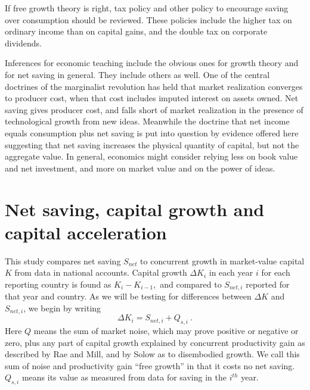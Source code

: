 If free growth theory is right, tax policy and other policy to encourage
saving over consumption should be reviewed. These policies
include the higher tax on ordinary income than on capital gains, and the
double tax on corporate dividends.

Inferences for economic teaching include the obvious ones for growth
theory and for net saving in general. They include others as well.
One of the central doctrines of the marginalist revolution has held that
market realization converges to producer cost, when that cost includes
imputed interest on assets owned. Net saving gives producer cost,
and falls short of market realization in the presence of technological
growth from new ideas. Meanwhile the doctrine that net income equals
consumption plus net saving is put into question by evidence offered
here suggesting that net saving increases the physical quantity of
capital, but not the aggregate value. In general, economics might
consider relying less on book value and net investment, and more on market value and on the
power of ideas.

\hypertarget{net-saving-and-capital-growth}{%
\section{Net saving, capital growth and capital acceleration}\label{net-saving-and-capital-growth}}

This study compares net saving \(S_{net}\) to concurrent growth in
market-value capital \(K\) from data in national accounts. Capital
growth \({\Delta K}_{i}\) in each year \(i\) for each reporting country
is found as \(K_{i} - K_{i - 1},\) and compared to \(S_{net,i}\)
reported for that year and country. As we will be testing for
differences between \(\Delta K\) and \(S_{net,i}\), we begin by writing
%
\begin{equation}
\Delta K_{i} =S_{net,i} + Q_{s,i}\ .\label{eq-1}
\end{equation}
%
Here \(Q\) means the sum of market noise, which may prove
positive or negative or zero, plus any part of capital growth explained
by concurrent productivity gain as described by Rae and Mill, and by
Solow as to disembodied growth. We call this sum of noise and
productivity gain ``free growth'' in that it costs no net saving.
\(Q_{s,i}\) means its value as measured from data for saving in the \(i^{th}\) year.

